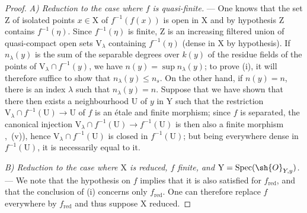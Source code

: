\begin{proof}
\emph{A) Reduction to the case where $f$ is quasi-finite.} ---
One knows  that the set $\mathrm{Z}$ of isolated points $x\in\mathrm{X}$ of $f^{-1}(f(x))$ is open in $\mathrm{X}$ and by hypothesis $\mathrm{Z}$ contains $f^{-1}(\eta)$.
Since $f^{-1}(\eta)$ is finite, $\mathrm{Z}$ is an increasing filtered union of quasi-compact open sets $\mathrm{V}_\lambda$ containing $f^{-1}(\eta)$ (dense in $\mathrm{X}$ by hypothesis).
If $n_\lambda(y)$ is the sum of the separable degrees over $k(y)$ of the residue fields of the points of $\mathrm{V}_\lambda\cap f^{-1}(y)$, we have $n(y)=\sup n_\lambda(y)$; to prove (i), it will therefore suffice to show that $n_\lambda(y)\leq n_s$.
On the other hand, if $n(y)=n$, there is an index $\lambda$ such that $n_\lambda(y)=n$. Suppose that we have shown that there then exists a neighbourhood $\mathrm{U}$ of $y$ in $\mathrm{Y}$ such that the restriction $\mathrm{V}_\lambda\cap f^{-1}(\mathrm{U})\to\mathrm{U}$ of $f$ is an \'etale and finite morphism; since $f$ is separated, the canonical injection $\mathrm{V}_\lambda\cap f^{-1}(\mathrm{U})\to f^{-1}(\mathrm{U})$ is then also a finite morphism ,~(v)), hence $\mathrm{V}_\lambda\cap f^{-1}(\mathrm{U})$ is closed in $f^{-1}(\mathrm{U})$; but being everywhere dense in $f^{-1}(\mathrm{U})$, it is necessarily equal to it.

\emph{B) Reduction to the case where $\mathrm{X}$ is reduced, $f$ finite, and $\mathrm{Y}=\operatorname{Spec}(\sh{O}_{Y,y})$.} ---
We note that the hypothesis on $f$ implies that it is also satisfied for $f_{\mathrm{red}}$, and that the conclusion of (i) concerns only $f_{\mathrm{red}}$.
One can therefore replace $f$ everywhere by $f_{\mathrm{red}}$ and thus suppose $\mathrm{X}$ reduced.


\end{proof}
